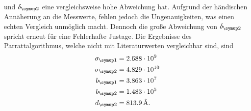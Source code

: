 und $\delta\idx{2}$ eine vergleichsweise hohe Abweichung hat. Aufgrund der händischen Annäherung an die Messwerte, fehlen jedoch die 
Ungenauigkeiten, was einen echten Vergleich unmöglich macht. Dennoch die große Abweichung von $\delta\idx{2}$ spricht erneut für eine 
Fehlerhafte Justage. Die Ergebnisse des Parrattalgorithmus, welche nicht mit Literaturwerten vergleichbar sind, sind 
\begin{equation}
    \begin{aligned}
        \sigma\idx{1} &= 2.688\cdot 10^{9} \\
        \sigma\idx{2} &= 4.829\cdot 10^{10} \\
        b\idx{1} &= 3.863\cdot 10^{7} \\
        b\idx{2} &= 1.483\cdot 10^{5} \\
        d\idx{2} &=  813.9\,\si{\angstrom}.
    \end{aligned}
\end{equation}